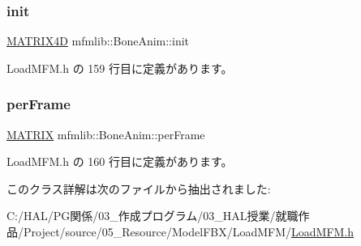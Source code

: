 \subsubsection{\texorpdfstring{init}{init}}
{\footnotesize\ttfamily \mbox{\hyperlink{structmfmlib_1_1_m_a_t_r_i_x4_d}{M\+A\+T\+R\+I\+X4D}} mfmlib\+::\+Bone\+Anim\+::init}



 Load\+M\+F\+M.\+h の 159 行目に定義があります。

\mbox{\label{classmfmlib_1_1_bone_anim_a31647fc544d8e6878209274519344ff3}} 
\subsubsection{\texorpdfstring{per\+Frame}{perFrame}}
{\footnotesize\ttfamily \mbox{\hyperlink{classmfmlib_1_1_m_a_t_r_i_x}{M\+A\+T\+R\+IX}} mfmlib\+::\+Bone\+Anim\+::per\+Frame}



 Load\+M\+F\+M.\+h の 160 行目に定義があります。



このクラス詳解は次のファイルから抽出されました\+:\begin{DoxyCompactItemize}
\item 
C\+:/\+H\+A\+L/\+P\+G関係/03\+\_\+作成プログラム/03\+\_\+\+H\+A\+L授業/就職作品/\+Project/source/05\+\_\+\+Resource/\+Model\+F\+B\+X/\+Load\+M\+F\+M/\mbox{\hyperlink{_load_m_f_m_8h}{Load\+M\+F\+M.\+h}}\end{DoxyCompactItemize}
